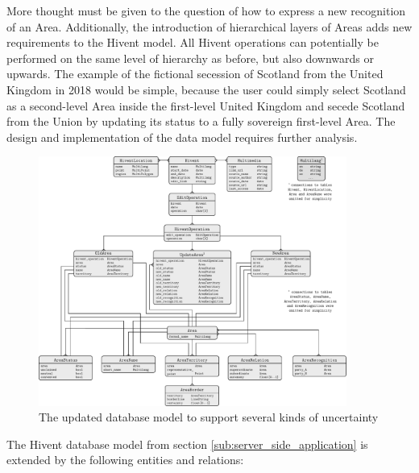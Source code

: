 \newpage
More thought must be given to the question of how to express a new recognition of an Area. Additionally, the introduction of hierarchical layers of Areas adds new requirements to the Hivent model. All Hivent operations can potentially be performed on the same level of hierarchy as before, but also downwards or upwards. The example of the fictional secession of Scotland from the United Kingdom in 2018 would be simple, because the user could simply select Scotland as a second-level Area inside the first-level United Kingdom and secede Scotland from the Union by updating its status to a fully sovereign first-level Area. The design and implementation of the data model requires further analysis.

\begin{figure}[H]
  \vspace{2.0em}
  \centering
  \includegraphics[width = 0.9\textwidth]{graphics/extensions/new_database_model}
  \caption{The updated database model to support several kinds of uncertainty}
  \label{fig:new_data_model}
\end{figure}

\newpage
The Hivent database model from section \ref{sub:server_side_application} is extended by the following entities and relations:

